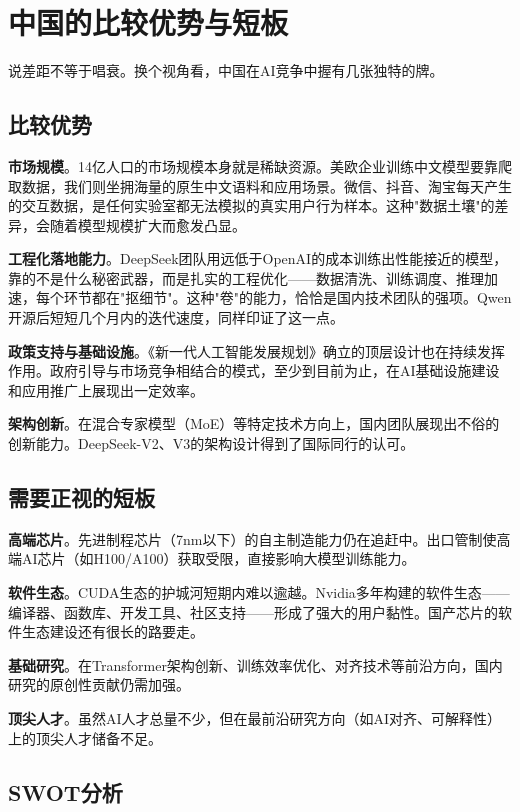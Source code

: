 \section{中国的比较优势与短板}

说差距不等于唱衰。换个视角看，中国在AI竞争中握有几张独特的牌。

\subsection{比较优势}

\textbf{市场规模}。14亿人口的市场规模本身就是稀缺资源。美欧企业训练中文模型要靠爬取数据，我们则坐拥海量的原生中文语料和应用场景。微信、抖音、淘宝每天产生的交互数据，是任何实验室都无法模拟的真实用户行为样本。这种"数据土壤"的差异，会随着模型规模扩大而愈发凸显。

\textbf{工程化落地能力}。DeepSeek团队用远低于OpenAI的成本训练出性能接近的模型，靠的不是什么秘密武器，而是扎实的工程优化——数据清洗、训练调度、推理加速，每个环节都在"抠细节"。这种"卷"的能力，恰恰是国内技术团队的强项。Qwen开源后短短几个月内的迭代速度，同样印证了这一点。

\textbf{政策支持与基础设施}。《新一代人工智能发展规划》确立的顶层设计也在持续发挥作用。政府引导与市场竞争相结合的模式，至少到目前为止，在AI基础设施建设和应用推广上展现出一定效率。

\textbf{架构创新}。在混合专家模型（MoE）等特定技术方向上，国内团队展现出不俗的创新能力。DeepSeek-V2、V3的架构设计得到了国际同行的认可。

\subsection{需要正视的短板}

\textbf{高端芯片}。先进制程芯片（7nm以下）的自主制造能力仍在追赶中。出口管制使高端AI芯片（如H100/A100）获取受限，直接影响大模型训练能力。

\textbf{软件生态}。CUDA生态的护城河短期内难以逾越。Nvidia多年构建的软件生态——编译器、函数库、开发工具、社区支持——形成了强大的用户黏性。国产芯片的软件生态建设还有很长的路要走。

\textbf{基础研究}。在Transformer架构创新、训练效率优化、对齐技术等前沿方向，国内研究的原创性贡献仍需加强。

\textbf{顶尖人才}。虽然AI人才总量不少，但在最前沿研究方向（如AI对齐、可解释性）上的顶尖人才储备不足。

\subsection{SWOT分析}

